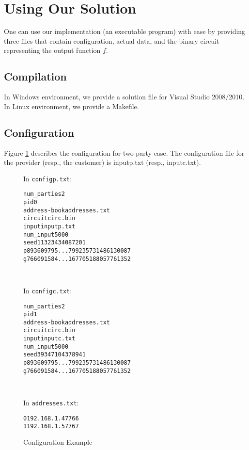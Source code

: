 \documentclass{article}
\begin{document}
\section{Using Our Solution}
One can use our implementation (an executable program) with ease by
providing three files that contain configuration, actual data, and the
binary circuit representing the output function $f$.

\subsection{Compilation}
In Windows environment, we provide a solution file for Visual Studio
2008/2010. In Linux environment, we provide a Makefile.

\subsection{Configuration}

Figure \ref{fig:config} describes the configuration for two-party
case. The configuration file for the provider (resp., the customer) is
inputp.txt (resp., inputc.txt).

\begin{figure}[b]
\small

\begin{minipage}[t]{0.35\textwidth}
In {\tt configp.txt}:
\begin{alltt}
num_parties 	2
pid				0
address-book	addresses.txt
circuit			circ.bin
input inputp.txt
num_input 5000
seed 11323434087201
p 893609795...799235731486130087
g 766091584...167705188057761352
\end{alltt}%
\end{minipage}
~~~~
\begin{minipage}[t]{0.35\textwidth}
In {\tt configc.txt}:
\begin{alltt}
num_parties 	2
pid				1
address-book	addresses.txt
circuit			circ.bin
input inputc.txt
num_input 5000
seed 39347104378941
p 893609795...799235731486130087
g 766091584...167705188057761352
\end{alltt}%
\end{minipage}
~~~
\begin{minipage}[t]{0.25\textwidth}
In {\tt addresses.txt}:
\begin{alltt}
0	192.168.1.4	7766
1	192.168.1.5 7767
\end{alltt}
\end{minipage}

\caption{Configuration Example}
\label{fig:config}
\end{figure}
\end{document}

